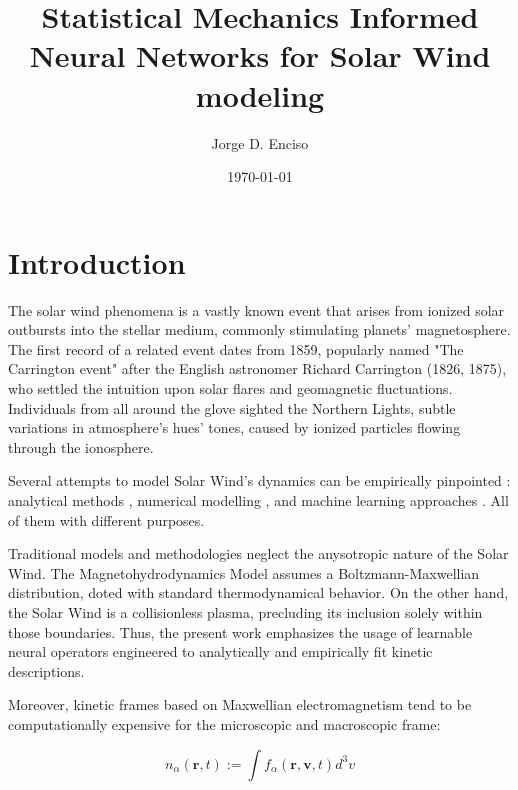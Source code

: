 \documentclass[12pt]{article}
\title{Statistical Mechanics Informed Neural Networks for Solar Wind modeling}
\author{Jorge D. Enciso}
\date{\today}
\begin{document}
\maketitle

\begin{abstract}
\end{abstract}

\tableofcontents
\newpage

\section{Introduction}

The solar wind phenomena is a vastly known event that arises from ionized solar outbursts into the stellar medium, commonly stimulating planets' magnetosphere. \cite{Gosling2007} The first record of a related event dates from 1859, popularly named "The Carrington event" after the English astronomer Richard Carrington (1826, 1875), who settled the intuition upon solar flares and geomagnetic fluctuations. Individuals from all around the glove sighted the Northern Lights, subtle variations in atmosphere's hues' tones, caused by ionized particles flowing through the ionosphere.

Several attempts to model Solar Wind's dynamics can be empirically pinpointed : analytical methods \cite{BLUME202396}, numerical modelling \cite{10.3389/fspas.2023.1105797, windmodelling1, Gombosi_2018}, and machine learning approaches \cite{comp_2, comp_3, guastavino2024forecastinggeoffectiveeventssolar, sabbatini2023solarwindspeedestimate, https://doi.org/10.1029/2023SW003561}. All of them with different purposes.

Traditional models and methodologies neglect the anysotropic nature of the Solar Wind. The Magnetohydrodynamics Model assumes a Boltzmann-Maxwellian distribution, doted with standard thermodynamical behavior. On the other hand, the Solar Wind is a collisionless plasma, precluding its inclusion solely within those boundaries. Thus, the present work emphasizes the usage of learnable neural operators engineered to analytically and empirically fit kinetic descriptions.

Moreover, kinetic frames based on Maxwellian electromagnetism tend to be computationally expensive for the microscopic and macroscopic frame:

\begin{equation}
    n_{\alpha} (\mathbf{r}, t) := \int f_{\alpha}(\mathbf{r}, \mathbf{v}, t) d^3v
\end{equation}
\end{document}
